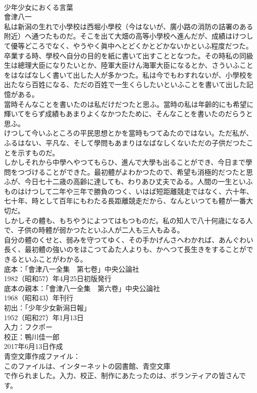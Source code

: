 \documentclass[8pt]{extreport}
\begin{document}
\begin{CJK}{UTF8}{min}
\\	少年少女におくる言葉
\\	會津八一
\\	私は新潟の生れで小學校は西堀小學校（今はないが、廣小路の消防の詰署のある附近）へ通つたものだ。そこを出て大畑の高等小學校へ進んだが、成績はけつして優等どころでなく、やうやく眞中へとどくかとどかないかといふ程度だつた。
\\	卒業する時、學校へ自分の目的を紙に書いて出すこととなつた。その時私の同級生は總理大臣になりたいとか、陸軍大臣けん海軍大臣になるとか、さういふことをはなばなしく書いて出した人が多かつた。私は今でもわすれないが、小學校を出たなら百姓になる、ただの百姓で一生くらしたいといふことを書いて出した記憶がある。
\\	當時そんなことを書いたのは私だけだつたと思ふ。當時の私は年齡的にも希望に輝いてをらず成績もあまりよくなかつたために、そんなことを書いたのだらうと思ふ。
\\	けつして今いふところの平民思想とかを當時もつてゐたのではない。ただ私が、ふるはない、平凡な、そして學問もあまりはなばなしくないただの子供だつたことを示すものだ。
\\	しかしそれから中學へやつてもらひ、進んで大學も出ることができ、今日まで學問をつづけることができた。最初體がよわかつたので、希望も消極的だつたと思ふが、今日七十二歳の高齡に達しても、わりあひ丈夫でゐる。人間の一生といふものはけつして二年や三年で勝負のつく、いはば短距離競走ではなく、六十年、七十年、時として百年にもわたる長距離競走だから、なんといつても體が一番大切だ。
\\	しかしその體も、もちやうによつてはもつものだ。私の知人で八十何歳になる人で、子供の時體が弱かつたといふ人が二人も三人もゐる。
\\	自分の體のくせと、弱みを守つてゆく、その手かげんさへわかれば、あんぐわい長く、最初體の強いのをほこつてゐた人よりも、かへつて長生きをすることができるといふことがわかる。
\\	底本：「會津八一全集　第七卷」中央公論社
\\	1982（昭和57）年4月25日初版発行
\\	底本の親本：「會津八一全集　第六卷」中央公論社
\\	1968（昭和43）年刊行
\\	初出：「少年少女新潟日報」
\\	1952（昭和27）年1月13日
\\	入力：フクポー
\\	校正：鴨川佳一郎
\\	2017年6月13日作成
\\	青空文庫作成ファイル：
\\	このファイルは、インターネットの図書館、青空文庫
\\	で作られました。入力、校正、制作にあたったのは、ボランティアの皆さんです。
\end{CJK}
\end{document}

